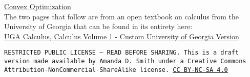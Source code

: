 \documentclass[10pt]{article}
\begin{document}
\href{http://web.stanford.edu/~boyd/cvxbook/}{Convex Optimization} \cite{boyd}\\

The two pages that follow are from an open textbook on calculus from the University of Georgia that can be found in its entirety here:\\

\href{Download for free at http://cnx.org/contents/1c1513d3-de69-41ee-bc4b-8266100f2958@2.1}{UGA Calculus, Calculus Volume 1 - Custom University of Georgia Version} \cite{UGAcalc}\\




\bigskip

\noindent
\texttt{\footnotesize RESTRICTED PUBLIC LICENSE --- READ BEFORE SHARING. This is a draft version made available by Amanda D. Smith under a Creative Commons Attribution-NonCommercial-ShareAlike license. 
\href{https://creativecommons.org/licenses/by-nc-sa/4.0/}{CC BY-NC-SA 4.0}}


\printbibliography


\end{document}
